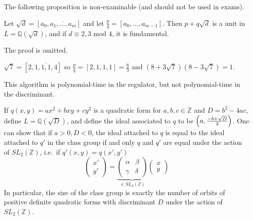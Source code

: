 The following proposition is non-examinable (and should not be used in exams).
\begin{proposition}
    Let \( \sqrt{d} = [a_0, \overline{a_1, \dots, a_m}] \) and let \( \frac{p}{q} = [a_0, \dots, a_{m-1}] \).
    Then \( p + q\sqrt{d} \) is a unit in \( L = \mathbb Q(\sqrt{d}) \), and if \( d \equiv 2, 3 \text{ mod } 4 \), it is fundamental.
\end{proposition}
The proof is omitted.
\begin{example}
    \( \sqrt{7} = [2,\overline{1,1,1,4}] \) so \( \frac{p}{q} = [2,1,1,1] = \frac{8}{3} \) and \( (8 + 3\sqrt{7})(8 - 3\sqrt{7}) = 1 \).
\end{example}
This algorithm is polynomial-time in the regulator, but not polynomial-time in the discriminant.

If \( q(x,y) = ax^2 + bxy + cy^2 \) is a quadratic form for \( a, b, c \in \mathbb Z \) and \( D = b^2 - 4ac \), define \( L = \mathbb Q(\sqrt{D}) \), and define the ideal associated to \( q \) to be \( \qty(a, \frac{-b+\sqrt{D}}{2}) \).
One can show that if \( a > 0, D < 0 \), the ideal attached to \( q \) is equal to the ideal attached to \( q' \) in the class group if and only \( q \) and \( q' \) are equal under the action of \( SL_2(\mathbb Z) \), i.e.\ if \( q'(x,y) = q(x',y') \)
\[ \begin{pmatrix}
    x' \\ y'
\end{pmatrix} = \underbrace{\begin{pmatrix}
    \alpha & \beta \\
    \gamma & \delta
\end{pmatrix}}_{\in SL_2(\mathbb Z)} \begin{pmatrix}
    x \\ y
\end{pmatrix} \]
In particular, the size of the class group is exactly the number of orbits of positive definite quadratic forms with discriminant \( D \) under the action of \( SL_2(\mathbb Z) \).
